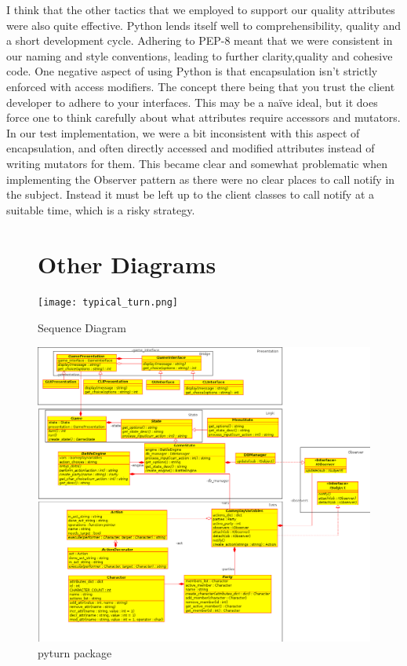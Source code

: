 \documentclass[11pt]{report}
\begin{document}
I think that the other tactics that we employed to support our quality attributes were also quite effective. Python lends itself well to comprehensibility, quality and a short development cycle. Adhering to PEP-8 meant that we were consistent in our naming and style conventions, leading to further clarity,quality and cohesive code. One negative aspect of using Python is that encapsulation isn’t strictly enforced with access modifiers. The concept there being that you trust the client developer to adhere to your interfaces. This may be a na\"{i}ve ideal, but it does force one to think carefully about what attributes require accessors and mutators. In our test implementation, we were a bit inconsistent with this aspect of encapsulation, and often directly accessed and modified attributes instead of writing mutators for them. This became clear and somewhat problematic when implementing the Observer pattern as there were no clear places to call notify in the subject. Instead it must be left up to the client classes to call notify at a suitable time, which is a risky strategy.


\begin{figure}[vtp]
\section{Other Diagrams}
\centering
\texttt{[image: typical\_turn.png]}
\caption{Sequence Diagram}
\label{Sequence Diagram}
\end{figure}
\begin{figure}[htp]
\centering
\includegraphics[scale=0.5]{pyturn.png}
\caption{pyturn package}
\label{pyturn package}
\end{figure}
\pagebreak
\end{document}
